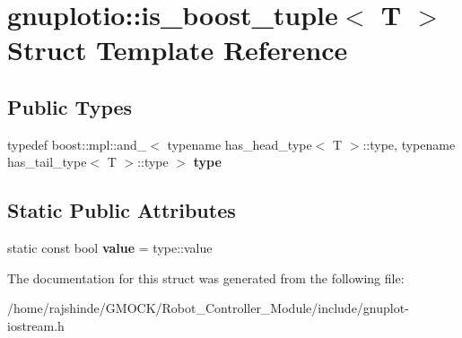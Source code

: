\hypertarget{structgnuplotio_1_1is__boost__tuple}{}\section{gnuplotio\+:\+:is\+\_\+boost\+\_\+tuple$<$ T $>$ Struct Template Reference}
\label{structgnuplotio_1_1is__boost__tuple}
\subsection*{Public Types}
\begin{DoxyCompactItemize}
\item 
typedef boost\+::mpl\+::and\+\_\+$<$ typename has\+\_\+head\+\_\+type$<$ T $>$\+::type, typename has\+\_\+tail\+\_\+type$<$ T $>$\+::type $>$ {\bfseries type}\hypertarget{structgnuplotio_1_1is__boost__tuple_ad771f62833b23ecae5dc689e6248396a}{}\label{structgnuplotio_1_1is__boost__tuple_ad771f62833b23ecae5dc689e6248396a}

\end{DoxyCompactItemize}
\subsection*{Static Public Attributes}
\begin{DoxyCompactItemize}
\item 
static const bool {\bfseries value} = type\+::value\hypertarget{structgnuplotio_1_1is__boost__tuple_ae6664b02421d28585204104af65a4744}{}\label{structgnuplotio_1_1is__boost__tuple_ae6664b02421d28585204104af65a4744}

\end{DoxyCompactItemize}


The documentation for this struct was generated from the following file\+:\begin{DoxyCompactItemize}
\item 
/home/rajshinde/\+G\+M\+O\+C\+K/\+Robot\+\_\+\+Controller\+\_\+\+Module/include/gnuplot-\/iostream.\+h\end{DoxyCompactItemize}
